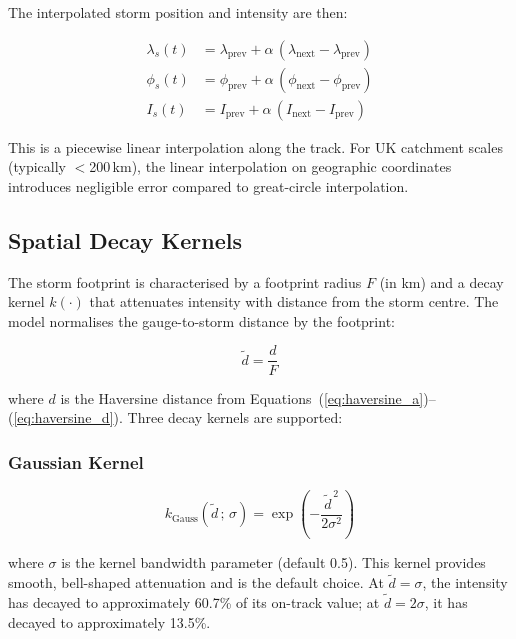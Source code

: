 \documentclass[11pt,a4paper]{article}
\begin{document}
The interpolated storm position and intensity are then:

\begin{align}
    \lambda_s(t) &= \lambda_{\text{prev}} + \alpha\,(\lambda_{\text{next}} - \lambda_{\text{prev}}) \label{eq:interp_lon} \\
    \phi_s(t) &= \phi_{\text{prev}} + \alpha\,(\phi_{\text{next}} - \phi_{\text{prev}}) \label{eq:interp_lat} \\
    I_s(t) &= I_{\text{prev}} + \alpha\,(I_{\text{next}} - I_{\text{prev}}) \label{eq:interp_intensity}
\end{align}

\noindent This is a piecewise linear interpolation along the track. For UK
catchment scales (typically $<$200\,km), the linear interpolation on geographic
coordinates introduces negligible error compared to great-circle interpolation.

\subsection{Spatial Decay Kernels}
\label{sec:decay_kernels}

The storm footprint is characterised by a footprint radius $F$ (in km) and a
decay kernel $k(\cdot)$ that attenuates intensity with distance from the storm
centre. The model normalises the gauge-to-storm distance by the footprint:

\begin{equation}
    \tilde{d} = \frac{d}{F}
    \label{eq:d_norm}
\end{equation}

\noindent where $d$ is the Haversine distance from
Equations~(\ref{eq:haversine_a})--(\ref{eq:haversine_d}). Three decay kernels
are supported:

\subsubsection{Gaussian Kernel}
\begin{equation}
    k_{\text{Gauss}}(\tilde{d}\,;\,\sigma) =
        \exp\!\left(-\frac{\tilde{d}^{\,2}}{2\sigma^2}\right)
    \label{eq:gaussian_kernel}
\end{equation}

\noindent where $\sigma$ is the kernel bandwidth parameter (default 0.5). This
kernel provides smooth, bell-shaped attenuation and is the default choice. At
$\tilde{d} = \sigma$, the intensity has decayed to approximately 60.7\% of its
on-track value; at $\tilde{d} = 2\sigma$, it has decayed to approximately 13.5\%.
\end{document}

